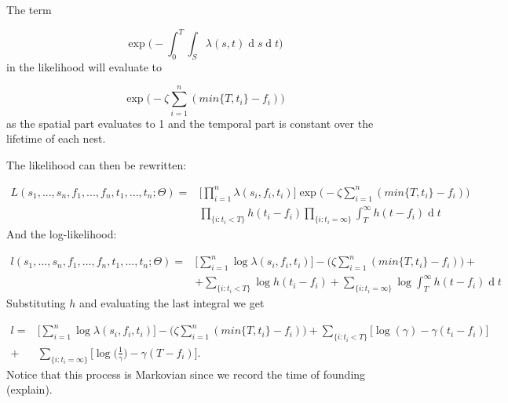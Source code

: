 \documentclass[11pt,a4paper]{article}
\renewcommand{\d}[1]{\ensuremath{\operatorname{d}\!{#1}}}
\begin{document}
The term 

\begin{equation}
\exp \bigg(- \int_{0}^{T} \int_{S} \lambda(s, t)\d s \d t \bigg)
\end{equation}
in the likelihood will evaluate to 


\[
\exp \bigg(- \zeta \sum_{i=1}^{n} (min\{ T, t_i \} - f_i) \bigg)
\]
as the spatial part evaluates to 1 and the temporal part is constant over the lifetime of each nest.

The likelihood can then be rewritten:

\[
\begin{aligned}
L(s_{1}, ..., s_{n}, f_{1}, ..., f_{n}, t_{1}, ..., t_{n} ; \Theta) = & \Bigg[ \prod_{i = 1}^{n} \lambda(s_{i},f_{i}, t_{i}) \Bigg] \exp \bigg(-\zeta \sum_{i=1}^{n} (min\{ T, t_i \} - f_i) \bigg) \\
& \prod_{\{ i : t_{i} < T \} }  h (t_{i} - f_{i}) \prod_{ \{ i : t_{i} = \infty \} } \int_{T}^{\infty} h(t - f_{i}) \d t
\end{aligned}
\]
And the log-likelihood:

\[
\begin{aligned}
l(s_{1}, ..., s_{n}, f_{1}, ..., f_{n}, t_{1}, ..., t_{n} ; \Theta) = & \Bigg[ \sum_{i = 1}^{n} \log \lambda(s_{i},f_{i}, t_{i}) \Bigg] - \bigg(\zeta \sum_{i=1}^{n} (min\{ T, t_i \} - f_i) \bigg)  + \\
& + \sum_{\{ i : t_{i} < T \} }  \log h (t_{i} - f_{i}) + \sum_{ \{ i : t_{i} = \infty \} } \log \int_{T}^{\infty} h(t - f_{i}) \d t
\end{aligned}
\]
Substituting $h$ and evaluating the last integral we get 

\[
\begin{aligned}
l = & \Bigg[ \sum_{i = 1}^{n} \log \lambda(s_{i},f_{i}, t_{i}) \Bigg] - \bigg(\zeta \sum_{i=1}^{n} (min\{ T, t_i \} - f_i) \bigg)  + \sum_{\{ i : t_{i} < T \} }  \bigg[\log (\gamma) -\gamma(t_{i} - f_{i}) \bigg] \\
+ & \sum_{ \{ i : t_{i} = \infty \} } \bigg[\log \bigg(\frac{1}{\gamma}\bigg) -\gamma(T - f_{i}) \bigg].
\end{aligned}
\]
{\color{red} Notice that this process is Markovian since we record the time of founding (explain)}.
\end{document}

